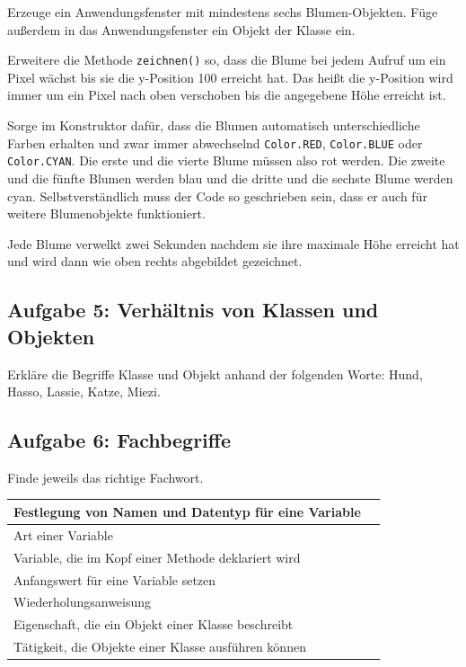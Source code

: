 \begin{compactenum}[a)]
\item Erzeuge ein Anwendungsfenster mit mindestens sechs Blumen-Objekten. Füge
außerdem in das Anwendungsfenster ein Objekt der Klasse  ein.

\item Erweitere die Methode \lstinline|zeichnen()| so, dass die Blume bei jedem
Aufruf um ein Pixel wächst bis sie die y-Position 100 erreicht hat. Das heißt
die y-Position wird immer um ein Pixel nach oben verschoben bis die angegebene
Höhe erreicht ist.

\item Sorge im Konstruktor dafür, dass die Blumen automatisch unterschiedliche
Farben erhalten und zwar immer abwechselnd \lstinline|Color.RED|,
\lstinline|Color.BLUE| oder \lstinline|Color.CYAN|. Die erste und die vierte
Blume müssen also rot werden. Die zweite und die fünfte Blumen werden blau und
die dritte und die sechste Blume werden cyan. Selbstverständlich muss der Code
so geschrieben sein, dass er auch für weitere Blumenobjekte funktioniert.

\item Jede Blume verwelkt zwei Sekunden nachdem sie ihre maximale Höhe erreicht
hat und wird dann wie oben rechts abgebildet gezeichnet.
\end{compactenum}


\subsection{Aufgabe 5: Verhältnis von Klassen und Objekten}

Erkläre die Begriffe Klasse und Objekt anhand der folgenden Worte: Hund, Hasso,
Lassie, Katze, Miezi.


\subsection{Aufgabe 6: Fachbegriffe} 

Finde jeweils das richtige Fachwort.

\bgroup
\def\arraystretch{1.2}
\begin{tabular}{|l|p{65mm}|}
\hline
Festlegung von Namen und Datentyp für eine Variable & \\ \hline
Art einer Variable & \\ \hline
Variable, die im Kopf einer Methode deklariert wird & \\ \hline
Anfangswert für eine Variable setzen & \\ \hline
Wiederholungsanweisung & \\ \hline
Eigenschaft, die ein Objekt einer Klasse beschreibt & \\ \hline
Tätigkeit, die Objekte einer Klasse ausführen können & \\ \hline
\end{tabular}
\egroup


